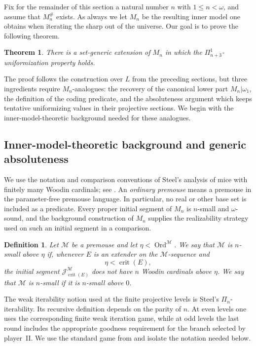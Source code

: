 \documentclass[a4paper,11pt]{article}
\newtheorem{definition}[theorem]{Definition}
\newtheorem*{theorem*}{Theorem}
\begin{document}
Fix for the remainder of this section a natural number $n$ with
$1\leq n<\omega$, and assume that  $M_n^{\#}$ exists. As always we let $M_n$ be the resulting inner model one obtains when iterating the sharp out of the universe.  Our goal is to prove the following theorem.

\begin{theorem*}
There is a set-generic extension of $M_n$ in which the
$\Pi^1_{n+3}$-uniformization property holds.
\end{theorem*}

The proof follows the construction over $L$ from the preceding sections, but
three ingredients require $M_n$-analogues: the recovery of the canonical lower
part $M_n|\omega_1$, the definition of the coding predicate, and
the absoluteness argument which keeps tentative uniformizing values in their
projective sections.  We begin with the inner-model-theoretic background needed
for these analogues.

\subsection{Inner-model-theoretic background and generic absoluteness}
\label{subsection-Mn-background-and-absoluteness}

We use the notation and comparison conventions of Steel's analysis of mice
with finitely many Woodin cardinals; see \cite{Steel2,Steel3}.  An
\emph{ordinary premouse} means a premouse in the parameter-free premouse
language.  In particular, no real or other base set is included as a predicate.
Every proper initial segment of $M_n$ is $n$-small and $\omega$-sound, and the
background construction of $M_n$ supplies the realizability strategy used on
such an initial segment in a comparison.

\begin{definition}
\label{definition-n-smallness}
Let $\mathcal M$ be a premouse and let
$\eta<\operatorname{Ord}^{\mathcal M}$.  We say that $\mathcal M$ is
\emph{$n$-small above $\eta$} if, whenever $E$ is an extender on the
$\mathcal M$-sequence and
\[
   \eta<\operatorname{crit}(E),
\]
the initial segment
$\mathcal J^{\mathcal M}_{\operatorname{crit}(E)}$ does not have $n$ Woodin
cardinals above $\eta$.  We say that $\mathcal M$ is \emph{$n$-small} if it
is $n$-small above $0$.
\end{definition}

The weak iterability notion used at the finite projective levels is Steel's
$\Pi_n$-iterability.  Its recursive definition depends on the parity of $n$.
At even levels one uses the corresponding finite weak iteration game, while at
odd levels the last round includes the appropriate goodness requirement for
the branch selected by player~II.  We use the standard game from
\cite{Steel2,Steel3} and isolate the notation needed below.
\end{document}
